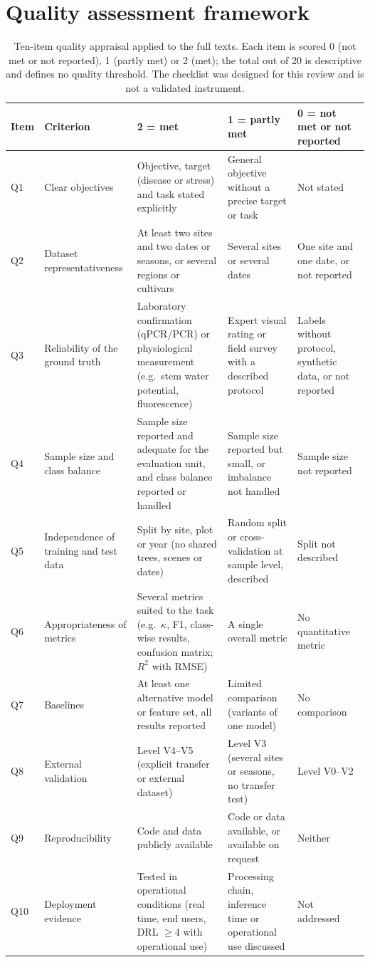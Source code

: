 \documentclass[preprint,12pt]{elsarticle}
\begin{document}
\section{Quality assessment framework}\label{app:qa}
\begin{table}[H]\centering\scriptsize
\caption{Ten-item quality appraisal applied to the full texts. Each item is scored 0 (not met or not reported), 1 (partly met) or 2 (met); the total out of 20 is descriptive and defines no quality threshold. The checklist was designed for this review and is not a validated instrument.}\label{tab:qa}
\begin{tabular}{@{}lL{2.03cm}L{3.20cm}L{2.81cm}L{2.58cm}@{}}\toprule
Item & Criterion & 2 = met & 1 = partly met & 0 = not met or not reported\\\midrule
Q1 & Clear objectives & Objective, target (disease or stress) and task stated explicitly & General objective without a precise target or task & Not stated\\
Q2 & Dataset representativeness & At least two sites and two dates or seasons, or several regions or cultivars & Several sites or several dates & One site and one date, or not reported\\
Q3 & Reliability of the ground truth & Laboratory confirmation (qPCR/PCR) or physiological measurement (e.g.\ stem water potential, fluorescence) & Expert visual rating or field survey with a described protocol & Labels without protocol, synthetic data, or not reported\\
Q4 & Sample size and class balance & Sample size reported and adequate for the evaluation unit, and class balance reported or handled & Sample size reported but small, or imbalance not handled & Sample size not reported\\
Q5 & Independence of training and test data & Split by site, plot or year (no shared trees, scenes or dates) & Random split or cross-validation at sample level, described & Split not described\\
Q6 & Appropriateness of metrics & Several metrics suited to the task (e.g.\ $\kappa$, F1, class-wise results, confusion matrix; $R^2$ with RMSE) & A single overall metric & No quantitative metric\\
Q7 & Baselines & At least one alternative model or feature set, all results reported & Limited comparison (variants of one model) & No comparison\\
Q8 & External validation & Level V4--V5 (explicit transfer or external dataset) & Level V3 (several sites or seasons, no transfer test) & Level V0--V2\\
Q9 & Reproducibility & Code and data publicly available & Code or data available, or available on request & Neither\\
Q10 & Deployment evidence & Tested in operational conditions (real time, end users, DRL $\geq$4 with operational use) & Processing chain, inference time or operational use discussed & Not addressed\\\bottomrule
\end{tabular}\end{table}
\end{document}
